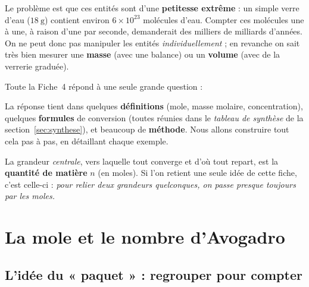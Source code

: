 \documentclass[11pt,a4paper]{article}
\begin{document}
Le problème est que ces entités sont d'une \textbf{petitesse extrême} : un simple verre d'eau
($\SI{18}{\gram}$) contient environ $6\times10^{23}$ molécules d'eau. Compter ces molécules une à une,
à raison d'une par seconde, demanderait des milliers de milliards d'années. On ne peut donc pas
manipuler les entités \emph{individuellement} ; en revanche on sait très bien mesurer une
\textbf{masse} (avec une balance) ou un \textbf{volume} (avec de la verrerie graduée).

\medskip
Toute la Fiche~4 répond à une seule grande question :

\begin{center}
\end{center}

\noindent
La réponse tient dans quelques \textbf{définitions} (mole, masse molaire, concentration), quelques
\textbf{formules} de conversion (toutes réunies dans le \emph{tableau de synthèse} de la
section~\ref{sec:synthese}), et beaucoup de \textbf{méthode}. Nous allons construire tout cela pas à
pas, en détaillant chaque exemple.

\begin{remarque}
La grandeur \emph{centrale}, vers laquelle tout converge et d'où tout repart, est la
\textbf{quantité de matière} $n$ (en moles). Si l'on retient une seule idée de cette fiche, c'est
celle-ci : \emph{pour relier deux grandeurs quelconques, on passe presque toujours par les moles.}
\end{remarque}

\section{La mole et le nombre d'Avogadro}
\subsection{L'idée du « paquet » : regrouper pour compter}
\end{document}
